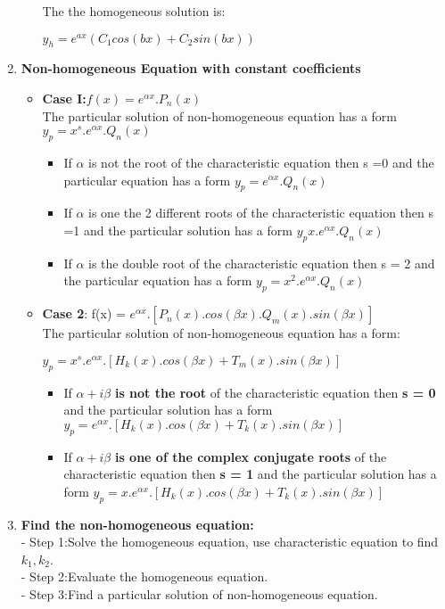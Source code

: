 \documentclass[10pt]{article}
\begin{document}
\begin{enumerate}
\begin{itemize}
		 The the homogeneous solution is:
		 \begin{mybox}
		 \begin{center}
		 $y_h = e^{ax} (C_1cos(bx) + C_2sin(bx))$
		 \end{center}
		 \end{mybox} 
	\end{itemize}
	\item \textbf{Non-homogeneous Equation with constant coefficients}
	\begin{itemize}
		\item \textbf{Case I:$f(x) = e^{\alpha x}.P_n(x)$}\\
		The particular solution of non-homogeneous equation has a form $y_p = x^s.e^{\alpha x}.Q_n(x)$
		\begin{itemize}
			\item If $\alpha$ is not the root of the characteristic equation then s =0 and the particular equation has a form $y_p = e^{\alpha x}.Q_n(x)$
			\item If $\alpha$ is one the 2 different roots of the characteristic equation then s =1 and the particular solution has a form $y_p x.e^{\alpha x}.Q_n(x)$
			\item If $\alpha$ is the double root of the characteristic equation then s = 2 and the particular equation has a form $y_p = x^2.e^{\alpha x}.Q_n(x)$
		\end{itemize}
		\item \textbf{Case 2}: f(x) = $e^{\alpha x}.[P_n(x).cos(\beta x).Q_m(x).sin(\beta x)]$\\
		The particular solution of non-homogeneous equation has a form:
		\begin{center}
		$y_p = x^s.e^{\alpha x}.[H_k(x).cos(\beta x) + T_m(x).sin(\beta x)]$
		\end{center}
		\begin{itemize}
			\item If $\alpha + i \beta$ \textbf{is not the root} of the characteristic equation then \textbf{s = 0} and the particular solution has a form $y_p = e^{\alpha x}.[H_k(x).cos(\beta x) + T_k(x).sin(\beta x)]$
			\item If $\alpha + i \beta$ \textbf{is one of the complex conjugate roots} of the characteristic equation then \textbf{s = 1} and the particular solution has a form $y_p = x.e^{\alpha x}.[H_k(x).cos(\beta x) + T_k(x).sin(\beta x)]$
		\end{itemize}
	\end{itemize}	
		\item \textbf{Find the non-homogeneous equation:}\\
		- Step 1:Solve the homogeneous equation, use characteristic equation to find $k_{1},k_{2}$.\\
		- Step 2:Evaluate the homogeneous equation.\\
		- Step 3:Find a particular solution of non-homogeneous equation. 
\end{enumerate}		   
\end{document}

